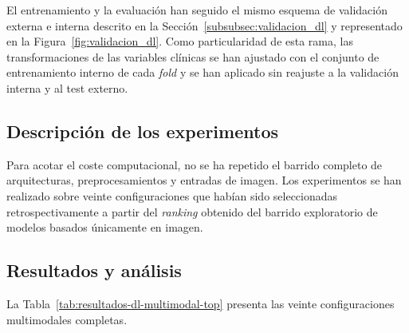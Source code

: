 El entrenamiento y la evaluación han seguido el mismo esquema de validación externa e interna descrito en la Sección~\ref{subsubsec:validacion_dl} y representado en la Figura~\ref{fig:validacion_dl}. Como particularidad de esta rama, las transformaciones de las variables clínicas se han ajustado con el conjunto de entrenamiento interno de cada \textit{fold} y se han aplicado sin reajuste a la validación interna y al test externo.

\subsection{Descripción de los experimentos}

Para acotar el coste computacional, no se ha repetido el barrido completo de arquitecturas, preprocesamientos y entradas de imagen. Los experimentos se han realizado sobre veinte configuraciones que habían sido seleccionadas retrospectivamente a partir del \textit{ranking} obtenido del barrido exploratorio de modelos basados únicamente en imagen.

\subsection{Resultados y análisis}

La Tabla~\ref{tab:resultados-dl-multimodal-top} presenta las veinte configuraciones multimodales completas.

